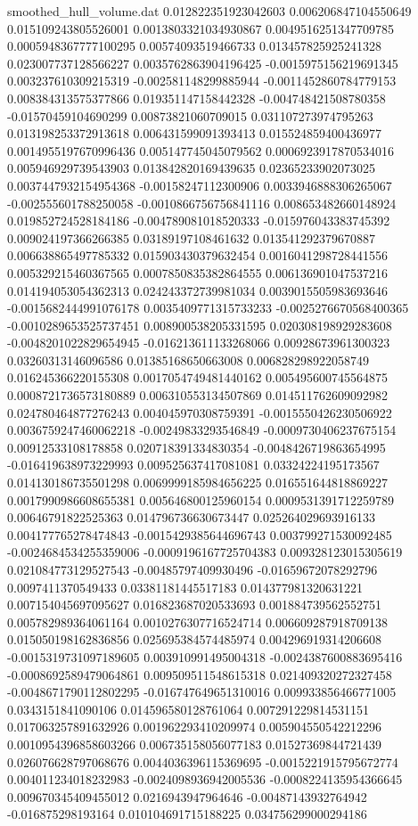 \begin{filecontents}{smoothed_hull_volume.dat}
0.012822351923042603	0.006206847104550649	0.015109243805526001	0.0013803321034930867	0.0049516251347709785	0.0005948367777100295	0.00574093519466733	0.013457825925241328	0.023007737128566227	0.0035762863904196425	-0.0015975156219691345	0.003237610309215319	-0.002581148299885944	-0.0011452860784779153	0.008384313575377866	0.019351147158442328	-0.004748421508780358	-0.01570459104690299	0.00873821060709015	0.031107273974795263
0.013198253372913618	0.006431599091393413	0.015524859400436977	0.0014955197670996436	0.005147745045079562	0.0006923917870534016	0.005946929739543903	0.013842820169439635	0.02365233902073025	0.0037447932154954368	-0.00158247112300906	0.0033946888306265067	-0.002555601788250058	-0.0010866756756841116	0.008653482660148924	0.019852724528184186	-0.004789081018520333	-0.015976043383745392	0.009024197366266385	0.03189197108461632
0.013541292379670887	0.006638865497785332	0.015903430379632454	0.0016041298728441556	0.005329215460367565	0.0007850835382864555	0.006136901047537216	0.014194053054362313	0.024243372739981034	0.0039015505983693646	-0.0015682444991076178	0.0035409771315733233	-0.0025276670568400365	-0.0010289653525737451	0.008900538205331595	0.020308198929283608	-0.0048201022829654945	-0.016213611133268066	0.00928673961300323	0.03260313146096586
0.01385168650663008	0.006828298922058749	0.016245366220155308	0.0017054749481440162	0.005495600745564875	0.0008721736573180889	0.006310553134507869	0.014511762609092982	0.024780464877276243	0.004045970308759391	-0.0015550426230506922	0.0036759247460062218	-0.00249833293546849	-0.0009730406237675154	0.00912533108178858	0.020718391334830354	-0.0048426719863654995	-0.016419638973229993	0.009525637417081081	0.03324224195173567
0.014130186735501298	0.0069999185984656225	0.016551644818869227	0.0017990986608655381	0.005646800125960154	0.0009531391712259789	0.00646791822525363	0.014796736630673447	0.025264029693916133	0.004177765278474843	-0.0015429385644696743	0.003799271530092485	-0.0024684534255359006	-0.0009196167725704383	0.009328123015305619	0.021084773129527543	-0.00485797409930496	-0.01659672078292796	0.0097411370549433	0.03381181445517183
0.014377981320631221	0.007154045697095627	0.016823687020533693	0.001884739562552751	0.005782989364061164	0.0010276307716524714	0.006609287918709138	0.015050198162836856	0.025695384574485974	0.004296919314206608	-0.0015319731097189605	0.003910991495004318	-0.0024387600883695416	-0.0008692589479064861	0.009509511548615318	0.021409320272327458	-0.0048671790112802295	-0.016747649651310016	0.009933856466771005	0.0343151841090106
0.014596580128761064	0.007291229814531151	0.017063257891632926	0.001962293410209974	0.005904550542212296	0.0010954396858603266	0.006735158056077183	0.01527369844721439	0.026076628797068676	0.0044036396115369695	-0.0015221915795672774	0.004011234018232983	-0.0024098936942005536	-0.0008224135954366645	0.009670345409455012	0.0216943947964646	-0.00487143932764942	-0.016875298193164	0.010104691715188225	0.034756299000294186

\end{filecontents}
